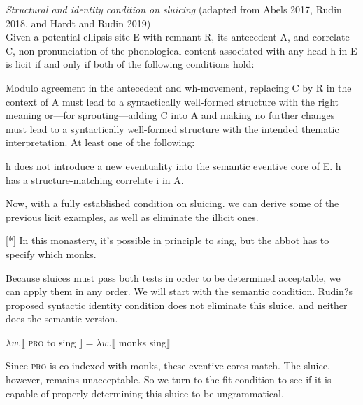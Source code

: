 \documentclass{turabian-researchpaper}
\begin{document}
\begin{exe}
\ex\label{idcondonsluicing2} \textit{Structural and identity condition on sluicing} (adapted from Abels 2017, Rudin 2018, and Hardt and Rudin 2019) \\
Given a potential ellipsis site E with remnant R, its antecedent A, and correlate C, non-pronunciation of the phonological content associated with any head h in E is licit if and only if both of the following conditions hold: 
\begin{xlist}
\ex\label{fit} Modulo agreement in the antecedent and wh-movement, replacing C by R in the context of A must lead to a syntactically well-formed structure with the right meaning or---for sprouting---adding C into A and making no further changes must lead to a syntactically well-formed structure with the intended thematic interpretation. 
\ex\label{semanticcond} At least one of the following: 
\begin{xlist}
\ex h does not introduce a new eventuality into the semantic eventive core of E.
\ex h has a structure-matching correlate i in A.
\end{xlist}
\end{xlist}
\end{exe}

Now, with a fully established condition on sluicing. we can derive some of the previous licit examples, as well as eliminate the illicit ones.  

\begin{exe}
[*] {In this monastery, it's possible in principle to sing, but the abbot has to specify which monks. }
\end{exe}

Because sluices must pass both tests in order to be determined acceptable, we can apply them in any order. We will start with the semantic condition. Rudin?s proposed syntactic identity condition does not eliminate this sluice, and neither does the semantic version. 

\begin{exe}
\ex\label{monksderiv} $\lambda w.\llbracket$ \textsc{pro} to sing $\rrbracket =  \lambda w.\llbracket$ monks sing$\rrbracket$ 
\end{exe}

Since \textsc{pro} is co-indexed with monks, these eventive cores match. The sluice, however, remains unacceptable. So we turn to the fit condition to see if it is capable of properly determining this sluice to be ungrammatical.
\end{document}
